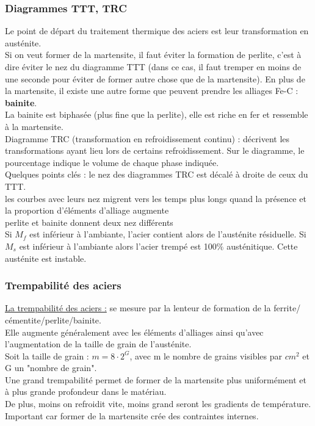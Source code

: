 \documentclass[../main.tex]{subfiles}
\begin{document}
\subsubsection{Diagrammes TTT, TRC}
Le point de départ du traitement thermique des aciers est leur transformation en austénite.\\
Si on veut former de la martensite, il faut éviter la formation de perlite, c'est à dire éviter le nez du diagramme TTT (dans ce cas, il faut tremper en moins de une seconde pour éviter de former autre chose que de la martensite). En plus de la martensite, il existe une autre forme que peuvent prendre les alliages Fe-C : \textbf{bainite}.\\

La bainite est biphasée (plus fine que la perlite), elle est riche en fer et ressemble à la martensite.\\

Diagramme TRC (transformation en refroidissement continu) : décrivent les transformations ayant lieu lors de certains refroidissement. Sur le diagramme, le pourcentage indique le volume de chaque phase indiquée.\\

Quelques points clés : le nez des diagrammes TRC est décalé à droite de ceux du TTT.\\
les courbes avec leurs nez migrent vers les temps plus longs quand la présence et la proportion d'éléments d'alliage augmente\\
perlite et bainite donnent deux nez différents\\

Si $M_f$ est inférieur à l'ambiante, l'acier contient alors de l'austénite résiduelle. Si $M_s$ est inférieur à l'ambiante alors l'acier trempé est 100$\%$ austénitique. Cette austénite est instable.\\

\subsubsection{Trempabilité des aciers}
\quad \underline{La trempabilité des aciers :} se mesure par la lenteur de formation de la ferrite/ cémentite/perlite/bainite.\\
Elle augmente généralement avec les éléments d'alliages ainsi qu'avec l'augmentation de la taille de grain de l'austénite.\\

Soit la taille de grain : $m = 8 \cdot2^G$, avec m le nombre de grains visibles par $cm^2$ et G un "nombre de grain".\\
Une grand trempabilité permet de former de la martensite plus uniformément et à plus grande profondeur dans le matériau.\\
De plus, moins on refroidit vite, moins grand seront les gradients de température. Important car former de la martensite crée des contraintes internes.\\
\end{document}
